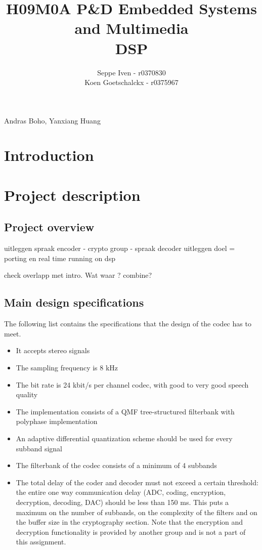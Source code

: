 \documentclass[a4paper]{article}
\title{H09M0A P\&D Embedded Systems and Multimedia \\ DSP}
\author{Seppe Iven - r0370830 \\ Koen Goetschalckx - r0375967}
\begin{document}
 
\maketitle
\begin{center}Andras Boho, Yanxiang Huang
\end{center}

\section{Introduction}
\section{Project description}
\subsection{Project overview}
uitleggen spraak encoder - crypto group - spraak decoder
uitleggen doel = porting en real time running on dsp

check overlapp met intro. Wat waar ?  combine?
\subsection{Main design specifications}
The following list contains the specifications that the design of the codec has to meet.

\begin{itemize}
\item It accepts stereo signals
\item The sampling frequency is 8 kHz
\item The bit rate is 24 kbit/s per channel codec, with good to very good speech quality
\item The implementation consists of a QMF tree-structured filterbank with polyphase implementation
\item An adaptive differential quantization scheme should be used for every subband signal
\item The filterbank of the codec consists of a minimum of 4 subbands
\item The total delay of the coder and decoder must not exceed a certain threshold: the entire one way communication delay (ADC, coding, encryption, decryption, decoding, DAC) should be less than 150 ms. This puts a maximum on the number of subbands, on the complexity of the filters and on the buffer size in the cryptography section. Note that the encryption and decryption functionality is provided by another group and is not a part of this assignment.

\end{itemize}
\end{document}

